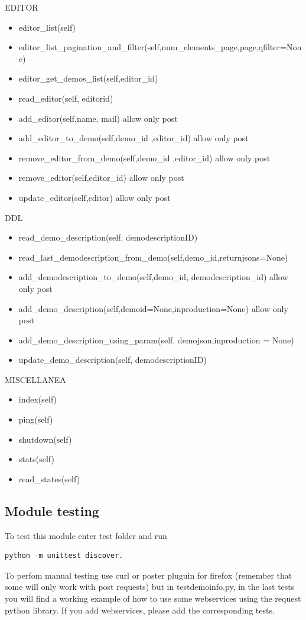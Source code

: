 EDITOR

\begin{itemize}
\item  editor\_list(self)
\item  editor\_list\_pagination\_and\_filter(self,num\_elements\_page,page,qfilter=None)
\item  editor\_get\_demos\_list(self,editor\_id)
\item  read\_editor(self, editorid)
\item  add\_editor(self,name, mail)
allow only post
\item  add\_editor\_to\_demo(self,demo\_id ,editor\_id)
allow only post
\item  remove\_editor\_from\_demo(self,demo\_id ,editor\_id)
allow only post
\item  remove\_editor(self,editor\_id)
allow only post
\item  update\_editor(self,editor)
allow only post
\end{itemize}

DDL

\begin{itemize}
\item  read\_demo\_description(self, demodescriptionID)
\item  read\_last\_demodescription\_from\_demo(self,demo\_id,returnjsons=None)
\item  add\_demodescription\_to\_demo(self,demo\_id, demodescription\_id)
allow only post
\item  add\_demo\_description(self,demoid=None,inproduction=None)
allow only post
\item  add\_demo\_description\_using\_param(self, demojson,inproduction = None)
\item  update\_demo\_description(self, demodescriptionID)
\end{itemize}

MISCELLANEA

\begin{itemize}
\item  index(self)
\item  ping(self)
\item  shutdown(self)
\item  stats(self)
\item  read\_states(self)
\end{itemize}


\subsection{Module testing}
To test this module enter test folder and run 
\begin{lstlisting}[language=Python,firstnumber=1]
python -m unittest discover.
\end{lstlisting}

To perfom manual testing use curl or poster pluguin for firefox (remember that some will only work with post requests) but in testdemoinfo.py, in the last tests you will find a working example of how to use some webservices using the request python library.
If you add webservices, please add the corresponding tests.